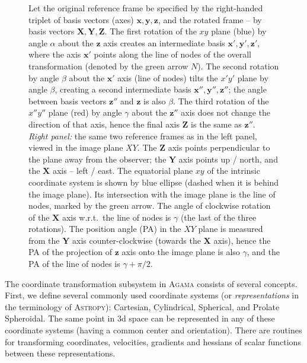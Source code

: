 \documentclass[12pt]{article}
\newcommand{\Agama}{\textsc{Agama}\xspace}
\newcommand{\bx}{\boldsymbol{x}}
\newcommand{\by}{\boldsymbol{y}}
\newcommand{\bz}{\boldsymbol{z}}
\newcommand{\bX}{\boldsymbol{X}}
\newcommand{\bY}{\boldsymbol{Y}}
\newcommand{\bZ}{\boldsymbol{Z}}
\begin{document}
\begin{figure}
{Let the original reference frame be specified by the right-handed triplet of basis vectors (axes) $\bx,\by,\bz$, and the rotated frame -- by basis vectors $\bX,\bY,\bZ$.
The first rotation of the $xy$ plane (blue) by angle $\alpha$ about the $\bz$ axis creates an intermediate basis $\bx',\by',\bz'$, where the axis $\bx'$ points along the line of nodes of the overall transformation (denoted by the green arrow $N$).
The second rotation by angle $\beta$ about the $\bx'$ axis (line of nodes) tilts the $x'y'$ plane by angle $\beta$, creating a second intermediate basis $\bx'',\by'',\bz''$; the angle between basis vectors $\bz''$ and $\bz$ is also $\beta$.
The third rotation of the $x''y''$ plane (red) by angle $\gamma$ about the $\bz''$ axis does not change the direction of that axis, hence the final axis $\bZ$ is the same as $\bz''$. \protect\\
\textit{Right panel:} the same two reference frames as in the left panel, viewed in the image plane $XY$. The $\bZ$ axis points perpendicular to the plane away from the observer; the $\bY$ axis points up / north, and the $\bX$ axis -- left / east. The equatorial plane $xy$ of the intrinsic coordinate system is shown by blue ellipse (dashed when it is behind the image plane). Its intersection with the image plane is the line of nodes, marked by the green arrow. The angle of clockwise rotation of the $\bX$ axis w.r.t.\ the line of nodes is $\gamma$ (the last of the three rotations). The position angle (PA) in the $XY$ plane is measured from the $\bY$ axis counter-clockwise (towards the $\bX$ axis), hence the PA of the projection of $\bz$ axis onto the image plane is also $\gamma$, and the PA of the line of nodes is $\gamma+\pi/2$.
} \label{fig:EulerAngles}
\end{figure}

The coordinate transformation subsystem in \Agama consists of several concepts.
First, we define several commonly used coordinate systems (or \textit{representations} in the terminology of \textsc{Astropy}): Cartesian, Cylindrical, Spherical, and Prolate Spheroidal. The same point in 3d space can be represented in any of these coordinate systems (having a common center and orientation). There are routines for transforming coordinates, velocities, gradients and hessians of scalar functions between these representations.
\end{document}
